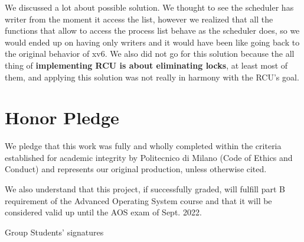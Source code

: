 \documentclass[10pt,a4]{article}
\begin{document}
We discussed a lot about possible solution. 
We thought to see the scheduler has writer from the moment it access the list, 
however we realized that all the functions that allow to access the process list behave as the scheduler does, 
so we would ended up on having only writers and it would have been like going back to the original behavior of xv6. 
We also did not go for this solution because the all thing of \textbf{implementing RCU is about eliminating locks}, 
at least most of them, and applying this solution was not really in harmony with the RCU's goal.

\pagebreak
\section{Honor Pledge}

We pledge that this work was fully and wholly completed within the criteria
established for academic integrity by Politecnico di Milano (Code of Ethics and
Conduct) and represents our original production, unless otherwise cited.

We also understand that this project, if successfully graded,  will fulfill part B requirement of the
Advanced Operating System course and that it will be considered valid up until
the AOS exam of Sept. 2022.

\begin{flushright}
Group Students' signatures
\end{flushright}
\end{document}

